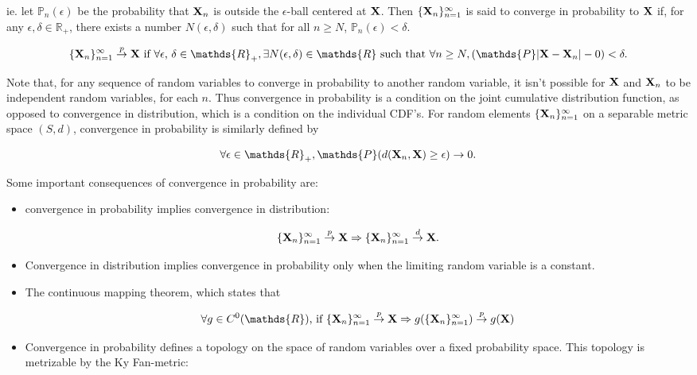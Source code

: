 \documentclass{homework}
\begin{document}
\begin{itemize}
    ie. let $\mathds{P}_n(\epsilon)$ be the probability that ${\bf X}_n$ is outside the $\epsilon$-ball centered at ${\bf X}$. Then $\{{\bf X}_n\}_{n=1}^{\infty}$ is said to converge in probability to ${\bf X}$ if, for any $\epsilon, \delta \in \mathds{R}_+$, there exists a number $N(\epsilon, \delta)$ such that for all $n \geq N$, $\mathds{P}_n(\epsilon) < \delta$.
    
    $$
    \seq \overset{p}{\rightarrow} \X \textnormal{ if } \forall \epsilon \textnormal{, } \delta \in \mathds{R}_+, \exists N(\epsilon, \delta) \in \mathds{R} \textnormal{ such that } \forall n \geq N, (\mathds{P}|\X-\X_n| - 0) < \delta.
    $$
    
    Note that, for any sequence of random variables to converge in probability to another random variable, it isn't possible for ${\bf X}$ and ${\bf X}_n$ to be independent random variables, for each $n$. Thus convergence in probability is a condition on the joint cumulative distribution function, as opposed to convergence in distribution, which is a condition on the individual CDF's. For random elements $\{{\bf X}_n\}_{n=1}^{\infty}$ on a separable metric space $(S, d)$, convergence in probability is similarly defined by 
    
    $$
    \forall \epsilon \in \mathds{R}_+, \mathds{P}(d(\X_n, \X) \geq \epsilon) \rightarrow 0.
    $$
    
    Some important consequences of convergence in probability are:
    
    \begin{itemize}
        \item convergence in probability implies convergence in distribution: 
        
        $$
        \{{\bf X}_n\}_{n=1}^{\infty} \overset{p}{\rightarrow} {\bf X} \Rightarrow \{{\bf X}_n\}_{n=1}^{\infty} \overset{d}{\rightarrow} {\bf X}.
        $$ 
        
        \item Convergence in distribution implies convergence in probability only when the limiting random variable is a constant. \\
        
        \item The continuous mapping theorem, which states that 
        
        $$
        \forall g \in C^{0}(\mathds{R}) \textnormal{, if } \seq \overset{p}{\rightarrow} \X \Rightarrow g(\seq) \overset{p}{\rightarrow} g(\X)
        $$
        
        \item Convergence in probability defines a topology on the space of random variables over  a fixed probability space. This topology is metrizable by the Ky Fan-metric:
        

\end{itemize}
\end{itemize}
\end{document}
